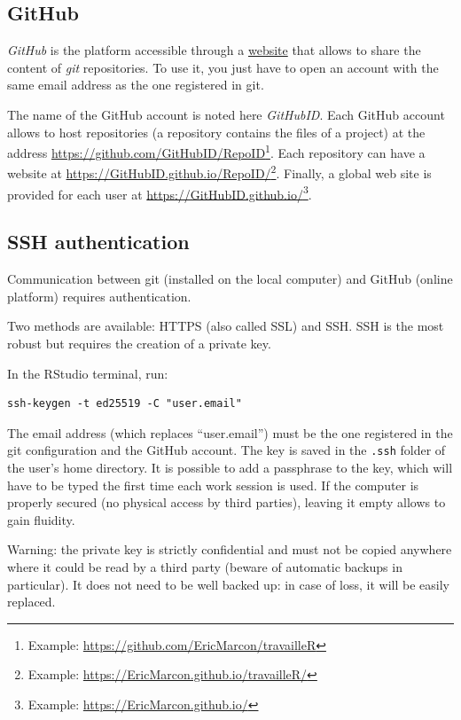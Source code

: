 \documentclass[
  12pt,
  american,
  a4paper,
  extrafontsizes,onecolumn,openright
  ]{memoir}
\begin{document}
\hypertarget{github}{%
\subsection{GitHub}\label{github}}

\emph{GitHub} is the platform accessible through a \href{https://github.com/}{website} that allows to share the content of \emph{git} repositories.
To use it, you just have to open an account with the same email address as the one registered in git.

The name of the GitHub account is noted here \emph{GitHubID}.
Each GitHub account allows to host repositories (a repository contains the files of a project) at the address \url{https://github.com/GitHubID/RepoID}\footnote{Example: \url{https://github.com/EricMarcon/travailleR}}.
Each repository can have a website at \url{https://GitHubID.github.io/RepoID/}\footnote{Example: \url{https://EricMarcon.github.io/travailleR/}}.
Finally, a global web site is provided for each user at \url{https://GitHubID.github.io/}\footnote{Example: \url{https://EricMarcon.github.io/}}.

\hypertarget{sec:SSH}{%
\subsection{SSH authentication}\label{sec:SSH}}

Communication between git (installed on the local computer) and GitHub (online platform) requires authentication.

Two methods are available: HTTPS (also called SSL) and SSH.
SSH is the most robust but requires the creation of a private key.

In the RStudio terminal, run:

\begin{verbatim}
ssh-keygen -t ed25519 -C "user.email"
\end{verbatim}

The email address (which replaces \enquote{user.email}) must be the one registered in the git configuration and the GitHub account.
The key is saved in the \texttt{.ssh} folder of the user's home directory.
It is possible to add a passphrase to the key, which will have to be typed the first time each work session is used.
If the computer is properly secured (no physical access by third parties), leaving it empty allows to gain fluidity.

Warning: the private key is strictly confidential and must not be copied anywhere where it could be read by a third party (beware of automatic backups in particular).
It does not need to be well backed up: in case of loss, it will be easily replaced.
\end{document}
